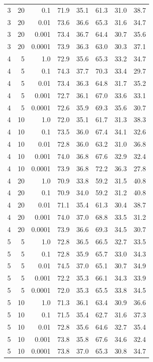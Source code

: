 \documentclass[12pt, a4paper]{article}
\begin{document}
\begin{table}[ht]
\begin{minipage}[t]{0.48\textwidth}
\begin{tabular}{rrrrrrrr}
3 & 20 & 0.1 & 71.9 & 35.1 & 61.3 & 31.0 & 38.7 \\
3 & 20 & 0.01 & 73.6 & 36.6 & 65.3 & 31.6 & 34.7 \\
3 & 20 & 0.001 & 73.4 & 36.7 & 64.4 & 30.7 & 35.6 \\
3 & 20 & 0.0001 & 73.9 & 36.3 & 63.0 & 30.3 & 37.1 \\
\midrule
4 & 5 & 1.0 & 72.9 & 35.6 & 65.3 & 33.2 & 34.7 \\
4 & 5 & 0.1 & 74.3 & 37.7 & 70.3 & 33.4 & 29.7 \\
4 & 5 & 0.01 & 73.4 & 36.3 & 64.8 & 31.7 & 35.2 \\
4 & 5 & 0.001 & 72.7 & 36.1 & 67.0 & 33.6 & 33.1 \\
4 & 5 & 0.0001 & 72.6 & 35.9 & 69.3 & 35.6 & 30.7 \\
4 & 10 & 1.0 & 72.0 & 35.1 & 61.7 & 31.3 & 38.3 \\
4 & 10 & 0.1 & 73.5 & 36.0 & 67.4 & 34.1 & 32.6 \\
4 & 10 & 0.01 & 72.8 & 36.0 & 63.2 & 31.0 & 36.8 \\
4 & 10 & 0.001 & 74.0 & 36.8 & 67.6 & 32.9 & 32.4 \\
4 & 10 & 0.0001 & 73.9 & 36.8 & 72.2 & 36.3 & 27.8 \\
4 & 20 & 1.0 & 70.9 & 33.8 & 59.2 & 31.5 & 40.8 \\
4 & 20 & 0.1 & 70.9 & 34.0 & 59.2 & 31.2 & 40.8 \\
4 & 20 & 0.01 & 71.1 & 35.4 & 61.3 & 30.4 & 38.7 \\
4 & 20 & 0.001 & 74.0 & 37.0 & 68.8 & 33.5 & 31.2 \\
4 & 20 & 0.0001 & 73.9 & 36.6 & 69.3 & 34.5 & 30.7 \\
\midrule
5 & 5 & 1.0 & 72.8 & 36.5 & 66.5 & 32.7 & 33.5 \\
5 & 5 & 0.1 & 72.8 & 35.9 & 65.7 & 33.0 & 34.3 \\
5 & 5 & 0.01 & 74.5 & 37.0 & 65.1 & 30.7 & 34.9 \\
5 & 5 & 0.001 & 72.2 & 35.3 & 66.1 & 34.3 & 33.9 \\
5 & 5 & 0.0001 & 72.0 & 35.3 & 65.5 & 33.8 & 34.5 \\
5 & 10 & 1.0 & 71.3 & 36.1 & 63.4 & 30.9 & 36.6 \\
5 & 10 & 0.1 & 71.5 & 35.4 & 62.7 & 31.6 & 37.3 \\
5 & 10 & 0.01 & 72.8 & 35.6 & 64.6 & 32.7 & 35.4 \\
5 & 10 & 0.001 & 73.8 & 35.8 & 67.6 & 34.6 & 32.4 \\
5 & 10 & 0.0001 & 73.8 & 37.0 & 65.3 & 30.8 & 34.7 \\

\end{tabular}
\end{minipage}
\end{table}
\end{document}
